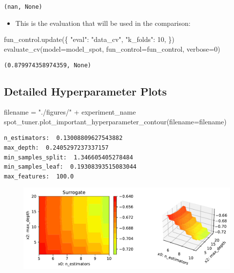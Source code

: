 \documentclass[
  letterpaper,
  DIV=11,
  numbers=noendperiod]{scrreprt}
\newenvironment{Shaded}{\begin{snugshade}}{\end{snugshade}}
\newcommand{\DecValTok}[1]{\textcolor[rgb]{0.68,0.00,0.00}{#1}}
\newcommand{\NormalTok}[1]{\textcolor[rgb]{0.00,0.23,0.31}{#1}}
\newcommand{\OperatorTok}[1]{\textcolor[rgb]{0.37,0.37,0.37}{#1}}
\newcommand{\StringTok}[1]{\textcolor[rgb]{0.13,0.47,0.30}{#1}}
\providecommand{\tightlist}{%
  \setlength{\itemsep}{0pt}\setlength{\parskip}{0pt}}\usepackage{longtable,booktabs,array}
\begin{document}
\begin{verbatim}
(nan, None)
\end{verbatim}

\begin{itemize}
\tightlist
\item
  This is the evaluation that will be used in the comparison:
\end{itemize}

\begin{Shaded}
\begin{Highlighting}[]
\NormalTok{fun\_control.update(\{}
     \StringTok{"eval"}\NormalTok{: }\StringTok{"data\_cv"}\NormalTok{,}
     \StringTok{"k\_folds"}\NormalTok{: }\DecValTok{10}\NormalTok{,}
\NormalTok{\})}
\NormalTok{evaluate\_cv(model}\OperatorTok{=}\NormalTok{model\_spot, fun\_control}\OperatorTok{=}\NormalTok{fun\_control, verbose}\OperatorTok{=}\DecValTok{0}\NormalTok{)}
\end{Highlighting}
\end{Shaded}

\begin{verbatim}
(0.879974358974359, None)
\end{verbatim}

\hypertarget{detailed-hyperparameter-plots-3}{%
\subsection{Detailed Hyperparameter
Plots}\label{detailed-hyperparameter-plots-3}}

\begin{Shaded}
\begin{Highlighting}[]
\NormalTok{filename }\OperatorTok{=} \StringTok{"./figures/"} \OperatorTok{+}\NormalTok{ experiment\_name}
\NormalTok{spot\_tuner.plot\_important\_hyperparameter\_contour(filename}\OperatorTok{=}\NormalTok{filename)}
\end{Highlighting}
\end{Shaded}

\begin{verbatim}
n_estimators:  0.13008809627543882
max_depth:  0.2405297237337157
min_samples_split:  1.346605405278484
min_samples_leaf:  0.19308393515083044
max_features:  100.0
\end{verbatim}

\begin{figure}[H]

{\centering \includegraphics{16_spot_hpt_sklearn_multiclass_classification_randomforest_files/figure-pdf/cell-48-output-2.pdf}

}

\end{figure}
\end{document}
